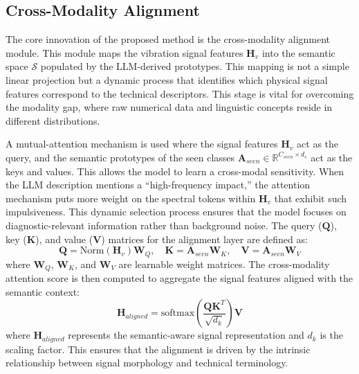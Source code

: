 \documentclass[journal]{IEEEtran}
\begin{document}


\subsection{Cross-Modality Alignment}

The core innovation of the proposed method is the cross-modality alignment module. This module maps the vibration signal features $\mathbf{H}_v$ into the semantic space $\mathcal{S}$ populated by the LLM-derived prototypes. This mapping is not a simple linear projection but a dynamic process that identifies which physical signal features correspond to the technical descriptors. This stage is vital for overcoming the modality gap, where raw numerical data and linguistic concepts reside in different distributions.

A mutual-attention mechanism is used where the signal features $\mathbf{H}_v$ act as the query, and the semantic prototypes of the seen classes $\mathbf{A}_{seen} \in \mathbb{R}^{C_{seen} \times d_s}$ act as the keys and values. This allows the model to learn a cross-modal sensitivity. When the LLM description mentions a ``high-frequency impact,'' the attention mechanism puts more weight on the spectral tokens within $\mathbf{H}_v$ that exhibit such impulsiveness. This dynamic selection process ensures that the model focuses on diagnostic-relevant information rather than background noise. The query ($\mathbf{Q}$), key ($\mathbf{K}$), and value ($\mathbf{V}$) matrices for the alignment layer are defined as:
\begin{equation}
\mathbf{Q} = \text{Norm}(\mathbf{H}_v) \mathbf{W}_Q, \quad \mathbf{K} = \mathbf{A}_{seen} \mathbf{W}_K, \quad \mathbf{V} = \mathbf{A}_{seen} \mathbf{W}_V
\end{equation}
where $\mathbf{W}_Q$, $\mathbf{W}_K$, and $\mathbf{W}_V$ are learnable weight matrices. The cross-modality attention score is then computed to aggregate the signal features aligned with the semantic context:
\begin{equation}
\mathbf{H}_{aligned} = \text{softmax}\left(\frac{\mathbf{Q}\mathbf{K}^T}{\sqrt{d_k}}\right) \mathbf{V}
\end{equation}
where $\mathbf{H}_{aligned}$ represents the semantic-aware signal representation and $d_k$ is the scaling factor. This ensures that the alignment is driven by the intrinsic relationship between signal morphology and technical terminology.
\end{document}

